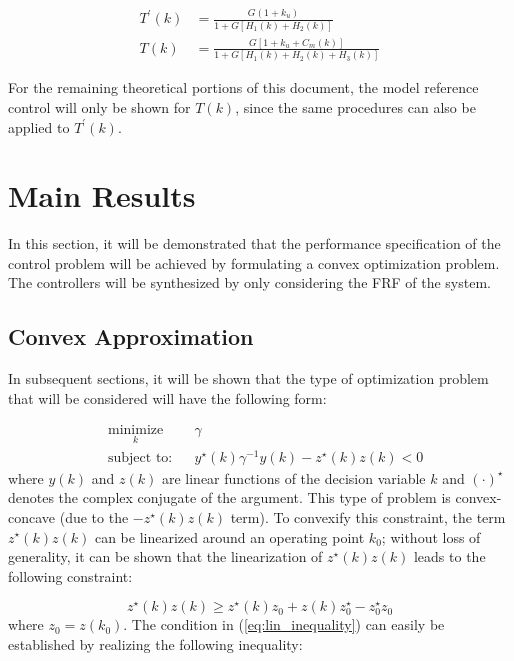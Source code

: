 \documentclass[a4paper, 10pt, conference]{ieeeconf}
\begin{document}
\begin{align}
T^{\prime}(k) &= \frac{G(1+k_u)}{1+G[H_1(k)+H_2(k)]} \label{eq:Tclp}  \\ 
T(k) &= \frac{G[1+k_u+C_m(k)]}{1+G[H_1(k)+H_2(k)+H_3(k)]}  \label{eq:Tcl} 
\end{align}

For the remaining theoretical portions of this document, the model reference control will only be shown for $T(k)$, since the same procedures can also be applied to $T^{\prime}(k)$. 

\section{Main Results}
\label{sec:main}
In this section, it will be demonstrated that the performance specification of the control problem will be achieved by formulating a convex optimization problem. The controllers will be synthesized by only considering the FRF of the system.

\subsection{Convex Approximation}
In subsequent sections, it will be shown that the type of optimization problem that will be considered will have the following form:

\begin{equation} \label{eq:con_cav}
\begin{aligned}
& \underset{ k }{\text{minimize}}
& & \gamma  \\
& \text{subject to:} & & y^{\star}(k) \gamma^{-1} y(k) - z^{\star}(k)z(k) < 0 
\end{aligned}
\end{equation}
where $y(k)$ and $z(k)$ are linear functions of the decision variable $k$ and $(\cdot)^{\star}$ denotes the complex conjugate of the argument. This type of problem is convex-concave (due to the $-z^{\star}(k)z(k)$ term). To convexify this constraint, the term $z^{\star}(k)z(k)$ can be linearized around an operating point $k_0$; without loss of generality, it can be shown that the linearization of $z^{\star}(k)z(k)$ leads to the following constraint:

\begin{equation} \label{eq:lin_inequality}
z^{\star}(k)z(k) \geq z^{\star}(k)z_0 + z(k)z_0^{\star} - z_0^{\star}z_0
\end{equation} 
where $z_0 = z(k_0)$. The condition in (\ref{eq:lin_inequality}) can easily be established by realizing the following inequality:
\end{document}
